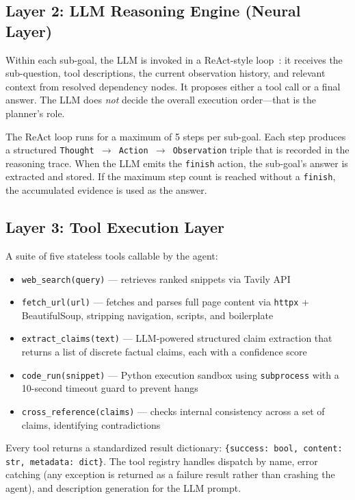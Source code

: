 \documentclass[11pt]{article}
\begin{document}
\subsection{Layer 2: LLM Reasoning Engine (Neural Layer)}

Within each sub-goal, the LLM is invoked in a ReAct-style loop~\cite{yao2023react}: it receives the sub-question, tool descriptions, the current observation history, and relevant context from resolved dependency nodes. It proposes either a tool call or a final answer. The LLM does \emph{not} decide the overall execution order---that is the planner's role.

The ReAct loop runs for a maximum of 5 steps per sub-goal. Each step produces a structured \texttt{Thought $\to$ Action $\to$ Observation} triple that is recorded in the reasoning trace. When the LLM emits the \texttt{finish} action, the sub-goal's answer is extracted and stored. If the maximum step count is reached without a \texttt{finish}, the accumulated evidence is used as the answer.

\subsection{Layer 3: Tool Execution Layer}

A suite of five stateless tools callable by the agent:

\begin{itemize}[leftmargin=1.5em, itemsep=1pt]
  \item \texttt{web\_search(query)} --- retrieves ranked snippets via Tavily API
  \item \texttt{fetch\_url(url)} --- fetches and parses full page content via \texttt{httpx} + BeautifulSoup, stripping navigation, scripts, and boilerplate
  \item \texttt{extract\_claims(text)} --- LLM-powered structured claim extraction that returns a list of discrete factual claims, each with a confidence score
  \item \texttt{code\_run(snippet)} --- Python execution sandbox using \texttt{subprocess} with a 10-second timeout guard to prevent hangs
  \item \texttt{cross\_reference(claims)} --- checks internal consistency across a set of claims, identifying contradictions
\end{itemize}

Every tool returns a standardized result dictionary: \texttt{\{success: bool, content: str, metadata: dict\}}. The tool registry handles dispatch by name, error catching (any exception is returned as a failure result rather than crashing the agent), and description generation for the LLM prompt.
\end{document}
